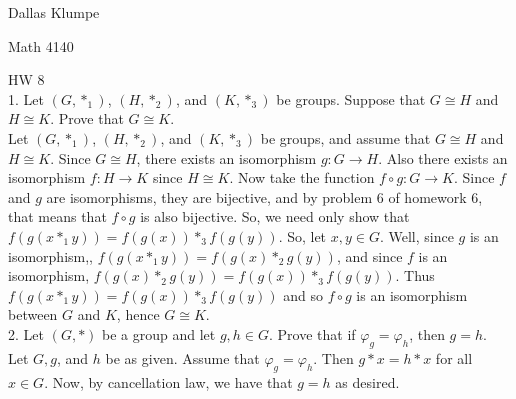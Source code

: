 \documentclass[12pt]{article}
\begin{document}
\noindent Dallas Klumpe

\noindent Math 4140

\noindent HW 8\\

1. Let $(G,*_1)$, $(H,*_2)$, and $(K,*_3)$ be groups. Suppose that $G\cong H$ and $H\cong K$. Prove that $G\cong K$.\\
Let $(G,*_1)$, $(H,*_2)$, and $(K,*_3)$ be groups, and assume that $G\cong H$ and $H\cong K$. Since $G\cong H$, there exists an isomorphism $g:G\rightarrow H$. Also there exists an isomorphism $f:H\rightarrow K$ since $H\cong K$. Now take the function $f\circ g:G\rightarrow K$. Since $f$ and $g$ are isomorphisms, they are bijective, and by problem 6 of homework 6, that means that $f\circ g$ is also bijective. So, we need only show that $f(g(x*_1y))=f(g(x))*_3f(g(y))$. So, let $x,y\in G$. Well, since $g$ is an isomorphism,, $f(g(x*_1y))=f(g(x)*_2g(y))$, and since $f$ is an isomorphism, $f(g(x)*_2g(y))=f(g(x))*_3f(g(y))$. Thus $f(g(x*_1y))=f(g(x))*_3f(g(y))$ and so $f\circ g$ is an isomorphism between $G$ and $K$, hence $G\cong K$.\\[20pt]

2. Let $(G,*)$ be a group and let $g,h\in G$. Prove that if $\varphi_g=\varphi_h$, then $g=h$.\\
Let $G, g$, and $h$ be as given. Assume that $\varphi_g=\varphi_h$. Then $g*x=h*x$ for all $x\in G$. Now, by cancellation law, we have that $g=h$ as desired.\\[20pt]
\end{document}

